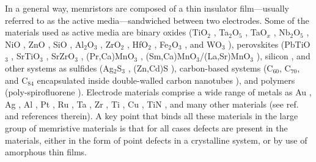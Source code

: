 In a general way, memristors are composed of a thin insulator film---usually referred to as the active media---sandwiched between two electrodes. Some of the materials used as active media are binary oxides (TiO$_2$ \cite{Choi2005,Hickmott1962,Argall1968,Kim2013c,Yang2011,Miao2011b,Williams2008}, Ta$_2$O$_5$ \cite{Pinto1971,Hickmott1962,Miao2011a,Beck2000}, TaO$_x$ \cite{Yang2010,Miao2012}, Nb$_2$O$_5$ \cite{Pinto1971,Kundozerova2012}, NiO \cite{Seo2004,Wang2013}, ZnO \cite{Huang2013,Chen2013}, SiO \cite{Simmons1967,Hickmott1962,Chang2013}, Al$_2$O$_3$ \cite{Hickmott1962}, ZrO$_2$ \cite{Hickmott1962,Kim2013b}, HfO$_2$ \cite{Syu2013,Luo2013}, Fe$_2$O$_3$ \cite{Kim2013a}, and WO$_3$ \cite{He2013}), perovskites (PbTiO$_3$ \cite{Pilch2014}, SrTiO$_3$ \cite{Muenstermann2010,Szot2006}, SrZrO$_3$ \cite{Beck2000,Rossel2001,Guo2013}, (Pr,Ca)MnO$_3$ \cite{Ignatiev2006}, (Sm,Ca)MnO$_3$/(La,Sr)MnO$_3$ \cite{Sawa2006}), silicon \cite{Dong2008,Mehonic2012}, and other systems as sulfides (Ag$_2$S$_3$ \cite{Hirose1976}, (Zn,Cd)S \cite{VanderSluis2003}), carbon-based systems (C$_{60}$, C$_{70}$, and C$_{84}$ encapsulated inside double-walled carbon nanotubes \cite{Li2009}), and polymers (poly-spirofluorene \cite{Gomes2008}). Electrode materials comprise a wide range of metals as Au \cite{Chopra1965,Hickmott1962,Beck2000}, Ag \cite{Chopra1965}, Al \cite{Chopra1965,Choi2005,Hickmott1962}, Pt \cite{Kim2013b,Choi2005,Miao2011a,Beck2000,Yang2010,Miao2012,Huang2013,Chen2013}, Ru \cite{Choi2005}, Ta \cite{Hickmott1962,Miao2011a,Yang2010,Miao2012}, Zr \cite{Hickmott1962}, Ti \cite{Hickmott1962,Syu2013}, Cu \cite{Waser2009}, TiN \cite{Kim2013b,Syu2013}, and many other materials (see ref. \cite{Pan2014} and references therein). A key point that binds all these materials in the large group of memristive materials is that for all cases defects are present in the materials, either in the form of point defects in a crystalline system, or by use of amorphous thin films.

